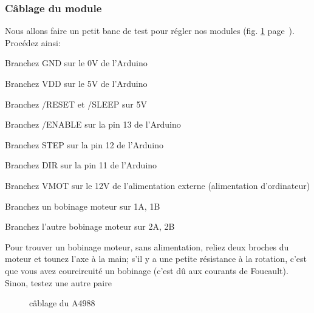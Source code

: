 \subsubsection{Câblage du module}
Nous allons faire un petit banc de test pour régler nos modules (fig. \ref{a4988_wired} %
page~\pageref{a4988_wired}). Procédez ainsi:\begin{dinglist}{71}%
\item{Branchez GND sur le 0V de l'Arduino}%
\item{Branchez VDD sur le 5V de l'Arduino}%
\item{Branchez /RESET et /SLEEP sur 5V}
\item{Branchez /ENABLE sur la pin 13 de l'Arduino}
\item{Branchez STEP sur la pin 12 de l'Arduino}
\item{Branchez DIR sur la pin 11 de l'Arduino}
\item{Branchez VMOT sur le 12V de l'alimentation externe (alimentation d'ordinateur)}
\item{Branchez un bobinage moteur sur 1A, 1B}
\item{Branchez l'autre bobinage moteur sur 2A, 2B}
\end{dinglist}%
Pour trouver un bobinage moteur, sans alimentation, reliez deux broches du moteur et tounez l'axe %
à la main; s'il y a une petite résistance à la rotation, c'est que vous avez courcircuité un bobinage %
(c'est dû aux courants de Foucault). Sinon, testez une autre paire%
\begin{figure}%
   \caption{\label{a4988_wired} câblage du A4988}%
\end{figure}%
